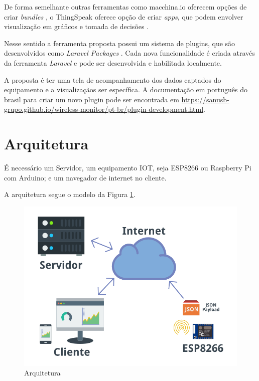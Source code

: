 De forma semelhante outras ferramentas como macchina.io oferecem opções
de criar \emph{bundles} \cite{macchina.io-2016}, o ThingSpeak oferece
opção de criar \emph{apps}, que podem envolver visualização em gráficos
e tomada de decisões \cite{thingspeak-2016}.

Nesse sentido a ferramenta proposta possui um sistema de plugins, que
são desenvolvidos como \emph{Laravel Packages}
\cite{laravel-packages-2016}. Cada nova funcionalidade é criada através
da ferramenta \emph{Laravel} e pode ser desenvolvida e habilitada
localmente.

A proposta é ter uma tela de acompanhamento dos dados captados do
equipamento e a visualizaçãos ser específica. A documentação em
português do brasil para criar um novo plugin pode ser encontrada em
\url{https://sanusb-grupo.github.io/wireless-monitor/pt-br/plugin-development.html}.

\section{Arquitetura}\label{arquitetura}

É necessário um Servidor, um equipamento IOT, seja ESP8266 ou Raspberry
Pi com Arduino; e um navegador de internet no cliente.

A arquitetura segue o modelo da Figura \ref{fig:arquitetura}.

\begin{figure}[h]
    \centering
    \includegraphics[scale=0.45]{img/arquitetura.png}
    \caption{Arquitetura} \label{fig:arquitetura}
\end{figure}

